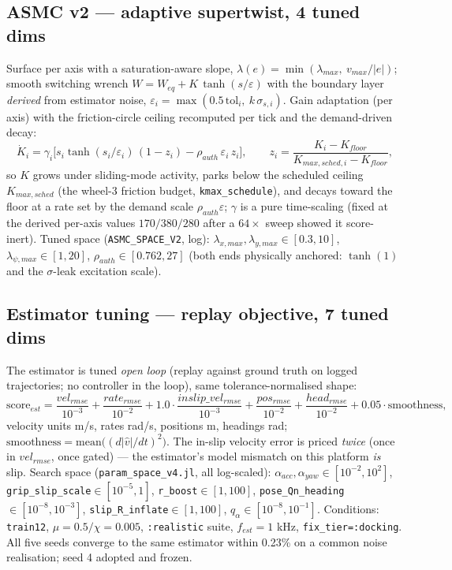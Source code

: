 \documentclass[11pt]{article}
\begin{document}
\subsection{ASMC v2 --- adaptive supertwist, 4 tuned dims}
Surface per axis with a saturation-aware slope, $\lambda(e)=\min(\lambda_{max},\
v_{max}/|e|)$; smooth switching wrench $W = W_{eq} + K\,\tanh(s/\varepsilon)$ with the
boundary layer \emph{derived} from estimator noise,
$\varepsilon_i=\max(0.5\,\text{tol}_i,\ k\,\sigma_{s,i})$.
Gain adaptation (per axis) with the friction-circle ceiling recomputed per tick and the
demand-driven decay:
\begin{equation}
\dot K_i=\gamma_i\Big[s_i\tanh(s_i/\varepsilon_i)\,(1-z_i)-\rho_{auth}\,\varepsilon_i\,z_i\Big],
\qquad
z_i=\frac{K_i-K_{floor}}{K_{max,sched,i}-K_{floor}},
\end{equation}
so $K$ grows under sliding-mode activity, parks below the scheduled ceiling $K_{max,sched}$
(the wheel-3 friction budget, \texttt{kmax\_schedule}), and decays toward the floor at a
rate set by the demand scale $\rho_{auth}\varepsilon$; $\gamma$ is a pure time-scaling
(fixed at the derived per-axis values $170/380/280$ after a $64\times$ sweep showed it
score-inert). Tuned space (\texttt{ASMC\_SPACE\_V2}, log):
$\lambda_{x,max},\lambda_{y,max}\in[0.3,10]$, $\lambda_{\psi,max}\in[1,20]$,
$\rho_{auth}\in[0.762,27]$ (both ends physically anchored: $\tanh(1)$ and the
$\sigma$-leak excitation scale).

\subsection{Estimator tuning --- replay objective, 7 tuned dims}
The estimator is tuned \emph{open loop} (replay against ground truth on logged
trajectories; no controller in the loop), same tolerance-normalised shape:
\begin{equation}
\text{score}_{est}=\frac{vel_{rmse}}{10^{-3}}+\frac{rate_{rmse}}{10^{-2}}
+1.0\cdot\frac{inslip\_vel_{rmse}}{10^{-3}}
+\frac{pos_{rmse}}{10^{-2}}+\frac{head_{rmse}}{10^{-2}}
+0.05\cdot\text{smoothness},
\end{equation}
velocity units m/s, rates rad/s, positions m, headings rad;
$\text{smoothness}=\mathrm{mean}\big((d|\hat v|/dt)^2\big)$. The in-slip velocity error is
priced \emph{twice} (once in $vel_{rmse}$, once gated) --- the estimator's model mismatch
on this platform \emph{is} slip. Search space (\texttt{param\_space\_v4.jl}, all
log-scaled): $\alpha_{acc},\alpha_{yaw}\in[10^{-2},10^{2}]$,
\texttt{grip\_slip\_scale}$\in[10^{-5},1]$, \texttt{r\_boost}$\in[1,100]$,
\texttt{pose\_Qn\_heading}$\in[10^{-8},10^{-3}]$,
\texttt{slip\_R\_inflate}$\in[1,100]$, $q_\alpha\in[10^{-8},10^{-1}]$.
Conditions: \texttt{train12}, $\mu=0.5/\chi=0.005$, \texttt{:realistic} suite,
$f_{est}=1$ kHz, \texttt{fix\_tier=:docking}. All five seeds converge to the same
estimator within 0.23\% on a common noise realisation; seed 4 adopted and frozen.
\end{document}
